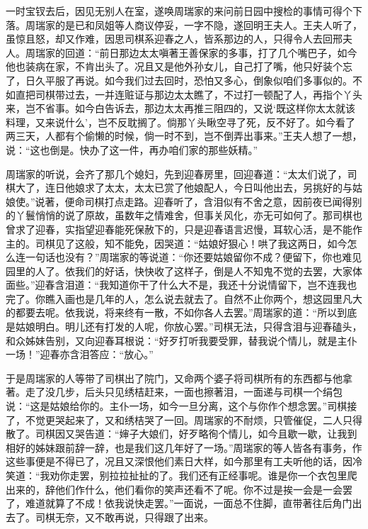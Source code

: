 \begin{parag}


    一时宝钗去后，因见无别人在室，遂唤周瑞家的来问前日园中搜检的事情可得个下落。周瑞家的是已和凤姐等人商议停妥，一字不隐，遂回明王夫人。王夫人听了，虽惊且怒，却又作难，因思司棋系迎春之人，皆系那边的人，只得令人去回邢夫人。周瑞家的回道：“前日那边太太嗔著王善保家的多事，打了几个嘴巴子，如今他也装病在家，不肯出头了。况且又是他外孙女儿，自己打了嘴，他只好装个忘了，日久平服了再说。如今我们过去回时，恐怕又多心，倒象似咱们多事似的。不如直把司棋带过去，一并连赃证与那边太太瞧了，不过打一顿配了人，再指个丫头来，岂不省事。如今白告诉去，那边太太再推三阻四的，又说‘既这样你太太就该料理，又来说什么’，岂不反耽搁了。倘那丫头瞅空寻了死，反不好了。如今看了两三天，人都有个偷懒的时候，倘一时不到，岂不倒弄出事来。”王夫人想了一想，说：“这也倒是。快办了这一件，再办咱们家的那些妖精。”
\end{parag}


\begin{parag}


    周瑞家的听说，会齐了那几个媳妇，先到迎春房里，回迎春道：“太太们说了，司棋大了，连日他娘求了太太，太太已赏了他娘配人，今日叫他出去，另挑好的与姑娘使。”说著，便命司棋打点走路。迎春听了，含泪似有不舍之意，因前夜已闻得别的丫鬟悄悄的说了原故，虽数年之情难舍，但事关风化，亦无可如何了。那司棋也曾求了迎春，实指望迎春能死保赦下的，只是迎春语言迟慢，耳软心活，是不能作主的。司棋见了这般，知不能免，因哭道：“姑娘好狠心！哄了我这两日，如今怎么连一句话也没有？”周瑞家的等说道：“你还要姑娘留你不成？便留下，你也难见园里的人了。依我们的好话，快快收了这样子，倒是人不知鬼不觉的去罢，大家体面些。”迎春含泪道：“我知道你干了什么大不是，我还十分说情留下，岂不连我也完了。你瞧入画也是几年的人，怎么说去就去了。自然不止你两个，想这园里凡大的都要去呢。依我说，将来终有一散，不如你各人去罢。”周瑞家的道：“所以到底是姑娘明白。明儿还有打发的人呢，你放心罢。”司棋无法，只得含泪与迎春磕头，和众姊妹告别，又向迎春耳根说：“好歹打听我要受罪，替我说个情儿，就是主仆一场！”迎春亦含泪答应：“放心。”
\end{parag}


\begin{parag}


    于是周瑞家的人等带了司棋出了院门，又命两个婆子将司棋所有的东西都与他拿著。走了没几步，后头只见绣桔赶来，一面也擦著泪，一面递与司棋一个绢包说：“这是姑娘给你的。主仆一场，如今一旦分离，这个与你作个想念罢。”司棋接了，不觉更哭起来了，又和绣桔哭了一回。周瑞家的不耐烦，只管催促，二人只得散了。司棋因又哭告道：“婶子大娘们，好歹略徇个情儿，如今且歇一歇，让我到相好的姊妹跟前辞一辞，也是我们这几年好了一场。”周瑞家的等人皆各有事务，作这些事便是不得已了，况且又深恨他们素日大样，如今那里有工夫听他的话，因冷笑道：“我劝你走罢，别拉拉扯扯的了。我们还有正经事呢。谁是你一个衣包里爬出来的，辞他们作什么，他们看你的笑声还看不了呢。你不过是挨一会是一会罢了，难道就算了不成！依我说快走罢。”一面说，一面总不住脚，直带著往后角门出去了。司棋无奈，又不敢再说，只得跟了出来。
\end{parag}


